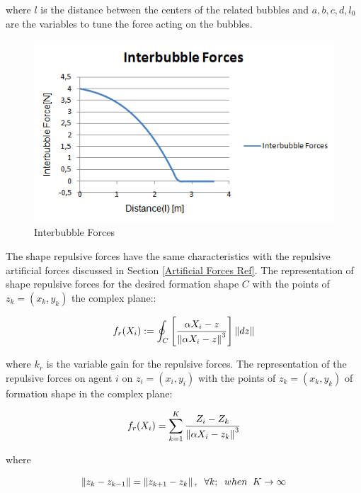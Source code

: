 where $l$ is the distance between the centers of the related bubbles and $a,b,c,d,l_0$ are the variables to tune the force acting on the bubbles. 

\begin{figure}[H]
\caption{Interbubble Forces}
\centering
\includegraphics[scale = 0.70]{interbubble_forces}
\end{figure}
	
The shape repulsive forces have the same characteristics with the repulsive artificial forces discussed in Section \ref{Artificial Forces Ref}. The representation of shape repulsive forces for the desired formation shape $C$ with the points of  $z_k = (x_k,y_k)$ the complex plane::
	
\begin{equation}
f_r(X_i) := \oint_C \left[\frac{\alpha X_i - z}{\left\lVert\alpha X_i - z\right\rVert^3}\right] \left\lVert dz\right\rVert
\end{equation}

where $k_r$ is the variable gain for the repulsive forces. The representation of the repulsive forces on agent $i$ on $z_i = (x_i, y_i)$ with the points of  $z_k = (x_k,y_k)$ of formation shape in the complex plane:

\begin{equation}
f_r(X_i) = \sum_{k=1}^{K} \frac{Z_i - Z_k}{\left\lVert\alpha X_i - z_k\right\rVert^3}
\end{equation}
				
where

\begin{equation}
\left\lVert z_k - z_{k-1}\right\rVert = \left\lVert z_{k+1} - z_k\right\rVert, \hspace{0.2cm}  \forall k ;  \hspace{0.2cm} when  \hspace{0.2cm} K \to\infty
\end{equation}
						

